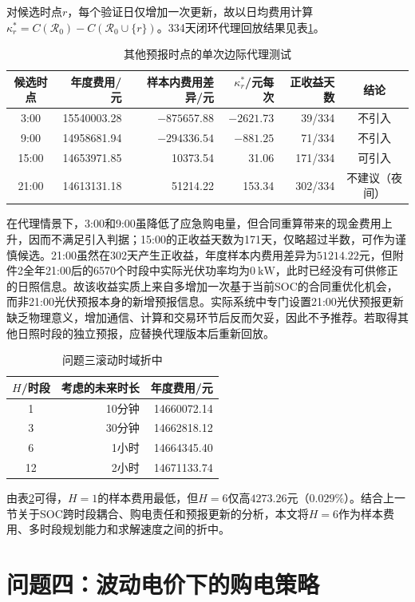 \documentclass[UTF8,12pt,a4paper]{ctexart}
\theoremstyle{remark}
\begin{document}
对候选时点$r$，每个验证日仅增加一次更新，故以日均费用计算
$\kappa_r^*=C(\mathcal R_0)-C(\mathcal R_0\cup\{r\})$。334天闭环代理回放结果见表\ref{tab:q3-extra-time}。
\begin{table}[htbp]\centering\small
\caption{其他预报时点的单次边际代理测试}\label{tab:q3-extra-time}
\begin{tabular}{crrrrc}\toprule
候选时点&年度费用/元&样本内费用差异/元&$\kappa_r^*$/元每次&正收益天数&结论\\\midrule
3:00&15540003.28&$-875657.88$&$-2621.73$&39/334&不引入\\
9:00&14958681.94&$-294336.54$&$-881.25$&71/334&不引入\\
15:00&14653971.85&10373.54&31.06&171/334&可引入\\
21:00&14613131.18&51214.22&153.34&302/334&不建议（夜间）\\\bottomrule
\end{tabular}
\end{table}
在代理情景下，3:00和9:00虽降低了应急购电量，但合同重算带来的现金费用上升，因而不满足引入判据；15:00的正收益天数为171天，仅略超过半数，可作为谨慎候选。21:00虽然在302天产生正收益，年度样本内费用差异为$51214.22$元，但附件2全年21:00后的6570个时段中实际光伏功率均为$0\ \mathrm{kW}$，此时已经没有可供修正的日照信息。故该收益实质上来自多增加一次基于当前SOC的合同重优化机会，而非21:00光伏预报本身的新增预报信息。实际系统中专门设置21:00光伏预报更新缺乏物理意义，增加通信、计算和交易环节后反而欠妥，因此不予推荐。若取得其他日照时段的独立预报，应替换代理版本后重新回放。

\begin{table}[htbp]\centering\caption{问题三滚动时域折中}\label{tab:q3-horizon}
\begin{tabular}{crr}\toprule
$H$/时段&考虑的未来时长&年度费用/元\\\midrule
1&10分钟&14660072.14\\3&30分钟&14662818.12\\
6&1小时&14664345.40\\12&2小时&14671133.74\\\bottomrule
\end{tabular}\end{table}
由表\ref{tab:q3-horizon}可得，$H=1$的样本费用最低，但$H=6$仅高$4273.26$元（$0.029\%$）。结合上一节关于SOC跨时段耦合、购电责任和预报更新的分析，本文将$H=6$作为样本费用、多时段规划能力和求解速度之间的折中。

\section{问题四：波动电价下的购电策略}
\end{document}
